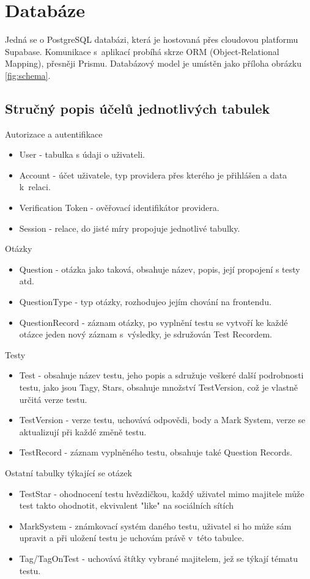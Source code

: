 \documentclass[12pt, a4paper,
openright
]{report}
\begin{document}
\clearpage
\section{Databáze}

Jedná se o PostgreSQL databázi, která je hostovaná přes cloudovou platformu Supabase. Komunikace s~aplikací probíhá skrze ORM (Object-Relational Mapping), přesněji Prismu. Databázový model je umístěn jako příloha obrázku \ref{fig:schema}.

\subsection{Stručný popis účelů jednotlivých tabulek}

Autorizace a autentifikace
\begin{itemize}[itemsep=0pt]
	\item User - tabulka s údaji o uživateli.
	\item Account - účet uživatele, typ providera přes kterého je přihlášen a data k~relaci.
	\item Verification Token - ověřovací identifikátor providera.
	\item Session - relace, do jisté míry propojuje jednotlivé tabulky.
\end{itemize} 
Otázky
\begin{itemize}
	\item Question - otázka jako taková, obsahuje název, popis, její propojení s testy atd.
	\item QuestionType - typ otázky, rozhodujeo  jejím chování na frontendu.
	\item QuestionRecord - záznam otázky, po vyplnění testu se vytvoří ke každé otázce jeden nový záznam s~výsledky, je sdružován Test Recordem.
\end{itemize}
Testy
\begin{itemize}
	\item Test - obsahuje název testu, jeho popis a sdružuje veškeré další podrobnosti testu, jako jsou Tagy, Stars, obsahuje množství TestVersion, což je vlastně určitá verze testu.
	\item TestVersion - verze testu, uchovává odpovědi, body a Mark System, verze se aktualizují při každé změně testu.
	\item TestRecord - záznam vyplněného testu, obsahuje také Question Records.
\end{itemize}
Ostatní tabulky týkající se otázek
\begin{itemize}
	\item TestStar - ohodnocení testu hvězdičkou, každý uživatel mimo majitele může test takto ohodnotit, ekvivalent "like" na sociálních sítích
	\item MarkSystem - známkovací systém daného testu, uživatel si ho může sám upravit a při uložení testu je uchovám právě v~této tabulce.
	\item Tag/TagOnTest - uchovává štítky vybrané majitelem, jež se týkají tématu testu.
\end{itemize}
\end{document}
